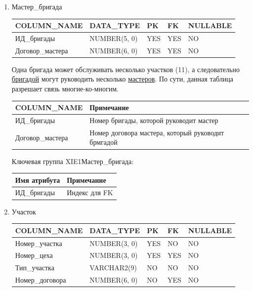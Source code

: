 \begin{enumerate}
\begin{tabular}{|p{4cm}|p{5cm}|}
    \end{tabular}

    \item Мастер\_бригада

    \begin{tabular}{|p{4cm}|p{3cm}|p{1cm}|p{1cm}|p{2cm}|} \hline

        {\bf COLUMN\_NAME} & {\bf DATA\_TYPE} & {\bf PK} & {\bf FK} & {\bf NULLABLE} \\ \hline
        ИД\_бригады & NUMBER(5, 0) & YES & YES & NO \\ \hline
        Договор\_мастера & NUMBER(6, 0) & YES & YES & NO \\ \hline

    \end{tabular}

    Одна бригада может обслуживать несколько участков (11), а следовательно \underline{бригадой} могут руководить несколько \underline{мастеров}.
    По сути, данная таблица разрешает связь многие-ко-многим.

    \begin{tabular}{|p{4cm}|p{5cm}|} \hline

        {\bf COLUMN\_NAME} & {\bf Примечание} \\ \hline
        ИД\_бригады & Номер бригады, которой руководит мастер \\ \hline
        Договор\_мастера & Номер договора мастера, который руководит брмгадой \\ \hline

    \end{tabular}

    Ключевая группа XIE1Мастер\_бригада:

    \begin{tabular}{|p{4cm}|p{5cm}|} \hline

        {\bf Имя атрибута} & {\bf Примечание} \\ \hline
        ИД\_бригады & Индекс для FK \\ \hline

    \end{tabular}

    \item{Участок}

    \begin{tabular}{|p{4cm}|p{3cm}|p{1cm}|p{1cm}|p{2cm}|} \hline

        {\bf COLUMN\_NAME} & {\bf DATA\_TYPE} & {\bf PK} & {\bf FK} & {\bf NULLABLE} \\ \hline
        Номер\_участка & NUMBER(3, 0) & YES & NO & NO \\ \hline
        Номер\_цеха & NUMBER(3, 0) & YES & YES & NO \\ \hline
        Тип\_участка & VARCHAR2(9) & NO & NO & NO \\ \hline
        Номер\_договора & NUMBER(6, 0) & NO & YES & NO \\ \hline


\end{tabular}
\end{enumerate}
